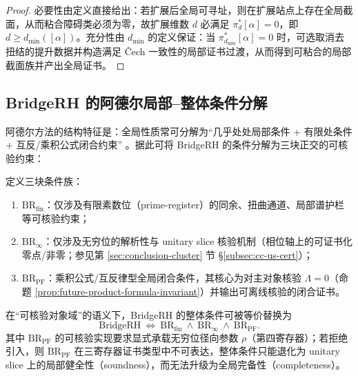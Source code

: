 \begin{proof}
必要性由定义直接给出：若扩展后全局可寻址，则在扩展站点上存在全局截面，从而粘合障碍类必须为零，故扩展维数 $d$ 必满足 $\pi_d^\ast[\alpha]=0$，即 $d\ge d_{\min}([\alpha])$。充分性由 $d_{\min}$ 的定义保证：当 $\pi_{d_{\min}}^\ast[\alpha]=0$ 时，可选取消去扭结的提升数据并构造满足 Čech 一致性的局部证书过渡，从而得到可粘合的局部截面族并产出全局证书。
\end{proof}

\subsection{BridgeRH 的阿德尔局部--整体条件分解}\label{subsubsec:future-bridge-adelic}
阿德尔方法的结构特征是：全局性质常可分解为“几乎处处局部条件 + 有限处条件 + 互反/乘积公式闭合约束” \cite{Sutherland2017AdelesStrongApprox,Conrad2005CompactIdele}。据此可将 BridgeRH 的条件分解为三块正交的可核验约束：

\begin{definition}[阿德尔式条件分解]\label{def:future-bridge-adelic}
定义三块条件族：
\begin{enumerate}
  \item $\mathrm{BR}_{\mathrm{fin}}$：仅涉及有限素数位（prime-register）的同余、扭曲通道、局部谱护栏等可核验约束；
  \item $\mathrm{BR}_{\infty}$：仅涉及无穷位的解析性与 unitary slice 核验机制（相位轴上的可证书化零点/非零；参见第 \ref{sec:conclusion-cluster} 节 \S\ref{subsec:cc-us-cert}）；
  \item $\mathrm{BR}_{\mathrm{PF}}$：乘积公式/互反律型全局闭合条件，其核心为对主对象核验 $\Lambda=0$（命题 \ref{prop:future-product-formula-invariant}）并输出可离线核验的闭合证书。
\end{enumerate}
\end{definition}

\begin{theorem}[条件分解与第四寄存器缺口]\label{thm:future-bridge-decomposition}
在“可核验对象域”的语义下，BridgeRH 的整体条件可被等价替换为
$$
\mathrm{BridgeRH}\ \Longleftrightarrow\ \mathrm{BR}_{\mathrm{fin}}\ \wedge\ \mathrm{BR}_{\infty}\ \wedge\ \mathrm{BR}_{\mathrm{PF}}.
$$
其中 $\mathrm{BR}_{\mathrm{PF}}$ 的可核验实现要求显式承载无穷位径向参数 $\rho$（第四寄存器）；若拒绝引入，则 $\mathrm{BR}_{\mathrm{PF}}$ 在三寄存器证书类型中不可表达，整体条件只能退化为 unitary slice 上的局部健全性（soundness），而无法升级为全局完备性（completeness）。
\end{theorem}

